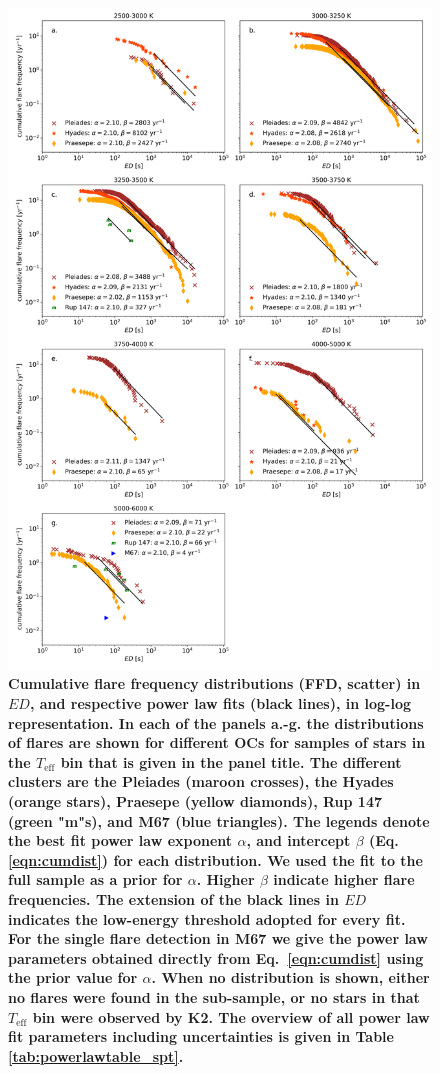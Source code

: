 \documentclass{aa}
\begin{document}
\begin{figure}[Ht!]
    \centering
    \includegraphics[width=14cm]{pics/FFDs/SpT_wise_sample_ffd_ED_wheatland.png}
    \caption{\textbf{Cumulative flare frequency distributions (FFD, scatter) in $ED$, and respective power law fits (black lines), in log-log representation. In each of the panels a.-g. the distributions of flares are shown for different OCs for samples of stars in the $T_\mathrm{eff}$ bin that is given in the panel title. The different clusters are the Pleiades (maroon crosses), the Hyades (orange stars), Praesepe (yellow diamonds), Rup 147 (green "m"s), and M67 (blue triangles). The legends denote the best fit power law exponent $\alpha$, and intercept $\beta$ (Eq. \ref{eqn:cumdist}) for each distribution. We used the fit to the full sample as a prior for $\alpha$. Higher $\beta$ indicate higher flare frequencies. The extension of the black lines in $ED$ indicates the low-energy threshold adopted for every fit. For the single flare detection in M67 we give the power law parameters obtained directly from Eq.~\ref{eqn:cumdist} using the prior value for $\alpha$. When no distribution is shown, either no flares were found in the sub-sample, or no stars in that $T_\mathrm{eff}$ bin were observed by K2. The overview of all power law fit parameters including uncertainties is given in Table \ref{tab:powerlawtable_spt}.} }          	
    \label{fig:powerlawfits_s}
\end{figure}
\end{document}
